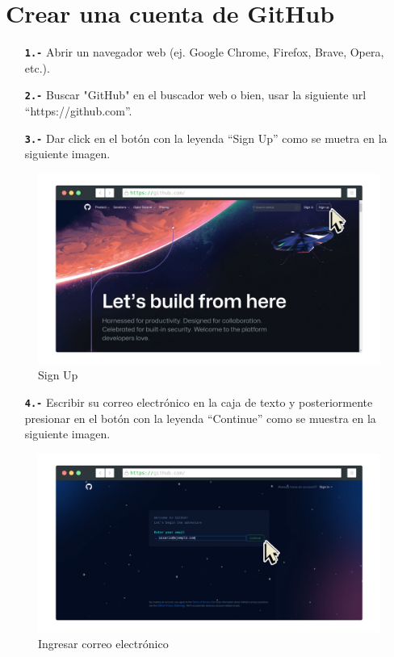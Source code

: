 \section{Crear una cuenta de GitHub}
\begin{itemize}
    \item[\textbf{\texttt{1.-}}] Abrir un navegador web (ej. Google Chrome, Firefox, Brave, Opera, etc.).
    \item[\textbf{\texttt{2.-}}] Buscar "GitHub" en el buscador web o bien, usar la siguiente url ``\textcolor{Naranjap}{https://github.com}''.
    \item[\textbf{\texttt{3.-}}] Dar click en el botón con la leyenda ``Sign Up'' como se muetra en la siguiente imagen.
\end{itemize}
\begin{figure}[H]
    \centering
    \includegraphics[width=\paperwidth-12cm]{screenshot-rocks-GitHub-cursor.png}
    \caption{Sign Up}
\end{figure}
\begin{itemize}
    \item[\textbf{\texttt{4.-}}] Escribir su correo electrónico en la caja de texto y posteriormente presionar en el botón con la leyenda ``Continue'' como se muestra en la siguiente imagen.
\end{itemize}
\begin{figure}[H]
    \centering
    \includegraphics[width=\paperwidth-12cm]{screenshot-rocks-GitHub-SignIn-cursor.png}
    \caption{Ingresar correo electrónico}
\end{figure}

